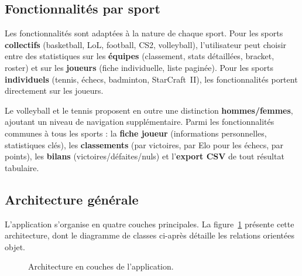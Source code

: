 \documentclass[12pt,a4paper]{article}
\begin{document}
\subsection{Fonctionnalités par sport}

Les fonctionnalités sont adaptées à la nature de chaque sport. Pour les sports
\textbf{collectifs} (basketball, LoL, football, CS2, volleyball), l'utilisateur peut choisir entre
des statistiques sur les \textbf{équipes} (classement, stats détaillées, bracket, roster) et sur
les \textbf{joueurs} (fiche individuelle, liste paginée). Pour les sports \textbf{individuels}
(tennis, échecs, badminton, StarCraft~II), les fonctionnalités portent directement sur les joueurs.

Le volleyball et le tennis proposent en outre une distinction \textbf{hommes/femmes}, ajoutant
un niveau de navigation supplémentaire. Parmi les fonctionnalités communes à tous les sports :
la \textbf{fiche joueur} (informations personnelles, statistiques clés), les
\textbf{classements} (par victoires, par Elo pour les échecs, par points), les
\textbf{bilans} (victoires/défaites/nuls) et l'\textbf{export CSV} de tout résultat tabulaire.

\subsection{Architecture générale}

L'application s'organise en quatre couches principales. La figure~\ref{fig:archi}
présente cette architecture, dont le diagramme de classes ci-après détaille les relations
orientées objet.

\begin{figure}[h!]
\centering
{}
\caption{Architecture en couches de l'application.}
\label{fig:archi}
\end{figure}
\end{document}
